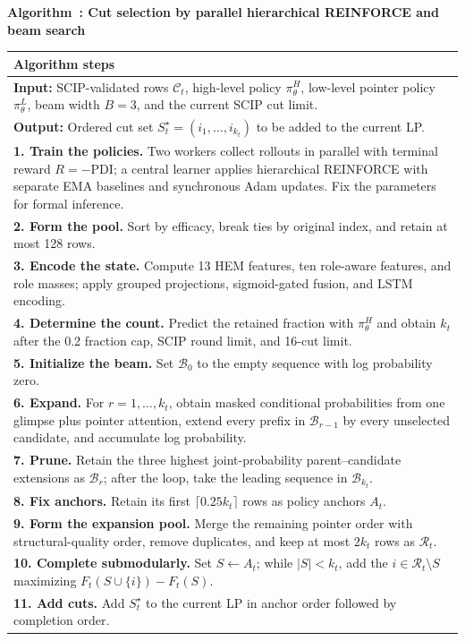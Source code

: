 \documentclass[journal]{IEEEtran}
\newcommand{\pdi}{\mathrm{PDI}}
\newcounter{algorithm}
\newcommand{\algorithmtitle}[1]{\refstepcounter{algorithm}\noindent\textbf{Algorithm~\thealgorithm: #1}\par\smallskip}
\begin{document}
\begin{table}[!htbp]
\raggedright
\footnotesize
\setlength{\tabcolsep}{3pt}
\algorithmtitle{Cut selection by parallel hierarchical REINFORCE and beam search}
\label{alg:cut-selection-en}
\begin{tabular}{>{\raggedright\arraybackslash}p{}}
\toprule
\textbf{Algorithm steps}\\
\midrule
\textbf{Input:} SCIP-validated rows $\mathcal C_t$, high-level policy $\pi_\theta^H$, low-level pointer policy $\pi_\theta^L$, beam width $B=3$, and the current SCIP cut limit.\\
\textbf{Output:} Ordered cut set $S_t^\star=(i_1,\ldots,i_{k_t})$ to be added to the current LP.\\
\textbf{1. Train the policies.} Two workers collect rollouts in parallel with terminal reward $R=-\pdi$; a central learner applies hierarchical REINFORCE with separate EMA baselines and synchronous Adam updates. Fix the parameters for formal inference.\\
\textbf{2. Form the pool.} Sort by efficacy, break ties by original index, and retain at most 128 rows.\\
\textbf{3. Encode the state.} Compute 13 HEM features, ten role-aware features, and role masses; apply grouped projections, sigmoid-gated fusion, and LSTM encoding.\\
\textbf{4. Determine the count.} Predict the retained fraction with $\pi_\theta^H$ and obtain $k_t$ after the 0.2 fraction cap, SCIP round limit, and 16-cut limit.\\
\textbf{5. Initialize the beam.} Set $\mathcal B_0$ to the empty sequence with log probability zero.\\
\textbf{6. Expand.} For $r=1,\ldots,k_t$, obtain masked conditional probabilities from one glimpse plus pointer attention, extend every prefix in $\mathcal B_{r-1}$ by every unselected candidate, and accumulate log probability.\\
\textbf{7. Prune.} Retain the three highest joint-probability parent--candidate extensions as $\mathcal B_r$; after the loop, take the leading sequence in $\mathcal B_{k_t}$.\\
\textbf{8. Fix anchors.} Retain its first $\lceil0.25k_t\rceil$ rows as policy anchors $A_t$.\\
\textbf{9. Form the expansion pool.} Merge the remaining pointer order with structural-quality order, remove duplicates, and keep at most $2k_t$ rows as $\mathcal R_t$.\\
\textbf{10. Complete submodularly.} Set $S\leftarrow A_t$; while $|S|<k_t$, add the $i\in\mathcal R_t\setminus S$ maximizing $F_t(S\cup\{i\})-F_t(S)$.\\
\textbf{11. Add cuts.} Add $S_t^\star$ to the current LP in anchor order followed by completion order.\\
\bottomrule
\end{tabular}
\end{table}
\end{document}
